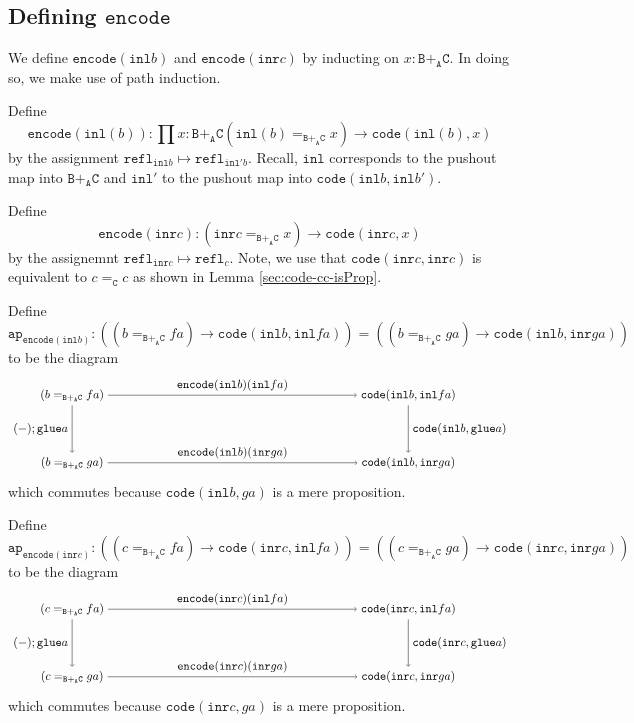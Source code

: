 \message{ !name(notes.tex)}\documentclass[12pt]{amsart}
\newcommand{\from}{\colon}
\newcommand{\type}[1]{\mathtt{#1}}
\newcommand{\tin}{\colon}
\newcommand{\A}{\type{A}}
\newcommand{\B}{\type{B}}
\newcommand{\C}{\type{C}}
\newcommand{\BAC}{\B +_{\A} \C}
\newcommand{\ap}{\type{ap}}
\newcommand{\inl}{\type{inl}}
\newcommand{\inr}{\type{inr}}
\newcommand{\glue}{\type{glue}}
\newcommand{\refl}{\type{refl}}
\newcommand{\code}{\type{code}}
\newcommand{\encode}{\type{encode}}
\theoremstyle{remark}
\theoremstyle{definition}
\begin{document}

\subsection{Defining \( \encode \)}
\label{sec:define-encode}

We define \( \encode ( \inl b ) \) and \( \encode ( \inr
c ) \) by inducting on \( x \tin \BAC \). In doing so, we make use of
path induction. 

Define 
\[
  \encode ( \inl (b) ) \from
  \prod\limits{ x \tin \BAC } ( \inl (b) =_{\BAC} x ) \to
  \code (\inl(b) , x)
\] 
by the assignment
%
\(
    \refl_{\inl b} \mapsto \refl_{\inl' b}.
\)
% 
Recall, \( \inl \) corresponds to the pushout map into \( \BAC \)
and \( \inl' \) to the pushout map into
\( \code ( \inl b , \inl b' ) \).

Define 
\[
  \encode ( \inr c ) \from
  ( \inr c =_{\BAC} x ) \to
  \code ( \inr c , x)
\] 
by the assignemnt
%
\(
    \refl_{ \inr c} \mapsto \refl_c.
\)
% 
Note, we use that
%
\(
    \code ( \inr c , \inr c )
\)
% 
is equivalent to \( c =_\C c \) as shown in Lemma
\ref{sec:code-cc-isProp}.

Define
\[
  \ap_{ \encode ( \inl b ) } \tin
  ( ( b =_{\BAC} fa ) \to \code ( \inl b , \inl fa ) ) =
  ( ( b =_{\BAC} ga ) \to \code ( \inl b , \inr ga ) )
\]
%
to be the diagram
%
\[
  \begin{tikzpicture}
    \node (1) at (-5,1) {\( ( b =_{\BAC} fa ) \)};
    \node (2) at (-5,-1) {\( ( b =_{\BAC} ga ) \)};
    \node (3) at (5,1) {\( \code ( \inl b , \inl fa ) \)};
    \node (4) at (5,-1) {\( \code ( \inl b , \inr ga ) \)};
    \draw [->] (1) to node [left]
      {\( (-) ; \glue a \)} (2);
    \draw [->] (1) to node [above]
      {\( \encode ( \inl b ) ( \inl fa ) \)} (3);
    \draw [->] (2) to node [above]
      {\( \encode ( \inl b ) ( \inr ga ) \)} (4);
    \draw [->] (3) to node [right]
      {\( \code ( \inl b , \glue a ) \)} (4); 
  \end{tikzpicture}
\]
%
which commutes because \( \code ( \inl b , ga ) \) is a mere proposition.
\par

Define
%
\[
  \ap_{ \encode ( \inr c ) } \tin
  ( ( c =_{\BAC} fa ) \to \code ( \inr c , \inl fa ) ) =
  ( ( c =_{\BAC} ga ) \to \code ( \inr c , \inr ga ) )
\]
%
to be the diagram
%
\[
  \begin{tikzpicture}
    \node (1) at (-5,1) {\( ( c =_{\BAC} fa ) \)};
    \node (2) at (-5,-1) {\( ( c =_{\BAC} ga ) \)};
    \node (3) at (5,1) {\( \code ( \inr c , \inl fa ) \)};
    \node (4) at (5,-1) {\( \code ( \inr c , \inr ga ) \)};
    \draw [->] (1) to node [left]
      {\( (-) ; \glue a \)} (2);
    \draw [->] (1) to node [above]
      {\( \encode ( \inr c ) ( \inl fa ) \)} (3);
    \draw [->] (2) to node [above]
      {\( \encode ( \inr c ) ( \inr ga ) \)} (4);
    \draw [->] (3) to node [right]
      {\( \code ( \inr c , \glue a ) \)} (4); 
  \end{tikzpicture}
\]
%
which commutes because \( \code ( \inr c , ga ) \) is a mere proposition.
\par
\end{document}
